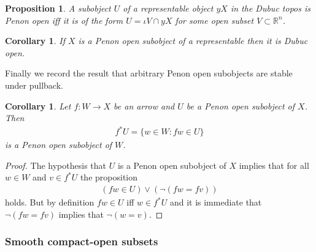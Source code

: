 \documentclass[pdftex]{sigma}
\numberwithin{equation}{section}
\newtheorem{Corollary}[Theorem]{Corollary}
\newtheorem{Proposition}[Theorem]{Proposition}
{ \theoremstyle{definition}
\newtheorem{Definition}[Theorem]{Definition}
\newtheorem{Notation}[Theorem]{Notation}
\newtheorem{Example}[Theorem]{Example}
\newtheorem{Remark}[Theorem]{Remark} }
\begin{document}
\begin{Proposition}\label{Penon-iff-Dubuc-on-representables}
A subobject $U$ of a representable object $yX$ in the Dubuc topos is Penon open iff it is of the form $U=\iota V\cap yX$ for some open subset $V\subset\mathbb{R}^{n}$.
\end{Proposition}
\begin{Corollary}\label{cor:penon-implies-dubuc}
 If $X$ is a Penon open subobject of a representable then it is Dubuc open.
\end{Corollary}
Finally we record the result that arbitrary Penon open subobjects are stable under pullback.

\begin{Corollary}
 Let $f \colon W \rightarrow X$ be an arrow and $ U $ be a Penon open subobject of $ X $. Then
\begin{gather*}
 f ^* U = \{ w \in W \colon f w \in U \}
\end{gather*}
is a Penon open subobject of $W$.
\end{Corollary}
\begin{proof}
 The hypothesis that $ U $ is a Penon open subobject of $ X $ implies that for all $w \in W$ and $v \in f ^* U$ the proposition
 \begin{gather*}
 ( fw \in U ) \vee ( \neg ( fw = fv ) )
 \end{gather*}
 holds. But by def\/inition $ fw \in U $ if\/f $ w \in f^*U $ and it is immediate that $ \neg ( fw = fv )$ implies that $ \neg (w = v )$.
\end{proof}

\subsubsection{Smooth compact-open subsets}\label{sec:smooth-compact-open-subsets}
\end{document}
